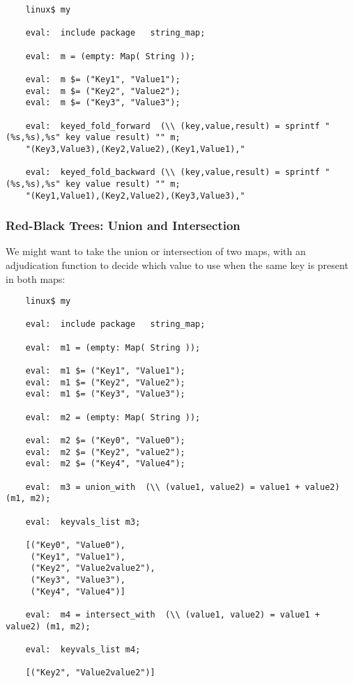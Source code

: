 \begin{verbatim}
    linux$ my

    eval:  include package   string_map;

    eval:  m = (empty: Map( String ));

    eval:  m $= ("Key1", "Value1");
    eval:  m $= ("Key2", "Value2");
    eval:  m $= ("Key3", "Value3");

    eval:  keyed_fold_forward  (\\ (key,value,result) = sprintf "(%s,%s),%s" key value result) "" m;
    "(Key3,Value3),(Key2,Value2),(Key1,Value1),"

    eval:  keyed_fold_backward (\\ (key,value,result) = sprintf "(%s,%s),%s" key value result) "" m;
    "(Key1,Value1),(Key2,Value2),(Key3,Value3),"
\end{verbatim}


\cutend*

\subsubsection{Red-Black Trees:  Union and Intersection}

We might want to take the union or intersection of two maps, 
with an adjudication function to decide which value to use 
when the same key is present in both maps:

\begin{verbatim}
    linux$ my

    eval:  include package   string_map;

    eval:  m1 = (empty: Map( String ));

    eval:  m1 $= ("Key1", "Value1");
    eval:  m1 $= ("Key2", "Value2");
    eval:  m1 $= ("Key3", "Value3");

    eval:  m2 = (empty: Map( String ));

    eval:  m2 $= ("Key0", "Value0");
    eval:  m2 $= ("Key2", "value2");
    eval:  m2 $= ("Key4", "Value4");

    eval:  m3 = union_with  (\\ (value1, value2) = value1 + value2) (m1, m2);

    eval:  keyvals_list m3;

    [("Key0", "Value0"),
     ("Key1", "Value1"), 
     ("Key2", "Value2value2"),
     ("Key3", "Value3"), 
     ("Key4", "Value4")]

    eval:  m4 = intersect_with  (\\ (value1, value2) = value1 + value2) (m1, m2);

    eval:  keyvals_list m4;

    [("Key2", "Value2value2")]
\end{verbatim}


